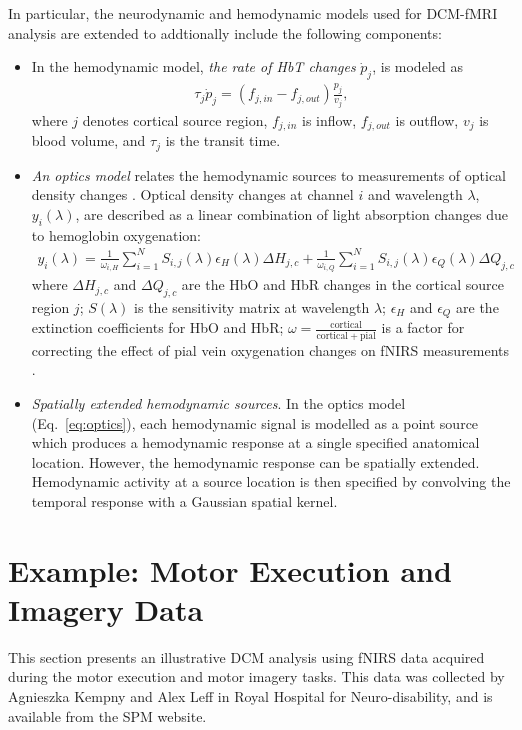 In particular, the neurodynamic and hemodynamic models used for DCM-fMRI analysis \citep{Friston2003a} are extended to addtionally include the following components:
\begin{itemize} 
\item In the hemodynamic model, \emph{the rate of HbT changes} $\dot{p}_j$, \citep{cui10} is modeled as
\begin{eqnarray} 
\tau_j \dot{p}_j  =  \left(f_{j,in} - f_{j,out}\right)\frac{p_j}{v_j},
\end{eqnarray}
where $j$ denotes cortical source region, $f_{j,in}$ is inflow, $f_{j,out}$ is outflow, $v_j$ is blood volume, and $\tau_j$ is the transit time. 

\item \emph{An optics model} relates the hemodynamic sources to measurements of optical density changes \citep{delpy1988estimation, arridge1999optical}. Optical density changes at channel $i$ and wavelength $\lambda$, $y_i(\lambda)$, are described as a linear combination of light absorption changes due to hemoglobin oxygenation: 
\begin{eqnarray}\label{eq:optics} 
y_i (\lambda) = \frac{1}{\omega_{i,H}} \sum_{i=1}^{N} S_{i,j}(\lambda)\epsilon_H(\lambda) \Delta H_{j,c} +  \frac{1}{\omega_{i,Q}} \sum_{i=1}^{N} S_{i,j}(\lambda)\epsilon_Q(\lambda) \Delta Q_{j,c}
\end{eqnarray} 
where $\Delta H_{j,c}$ and $\Delta Q_{j,c}$ are the HbO and HbR changes in the cortical source region $j$; $S(\lambda)$ is the sensitivity matrix at wavelength $\lambda$; $\epsilon_H$ and $\epsilon_Q$ are the extinction coefficients for HbO and HbR; $\omega = \frac{\mathrm{cortical}}{\mathrm{cortical} + \mathrm{pial}}$ is a factor for correcting the effect of pial vein oxygenation changes on fNIRS measurements  \citep{gagnon2012quantification}. 

\item \emph{Spatially extended hemodynamic sources}. In the optics model (Eq.~\ref{eq:optics}), each hemodynamic signal is modelled as a point source which produces a hemodynamic response at a single specified anatomical location. However, the hemodynamic response can be spatially extended. Hemodynamic activity at a source location is then specified by convolving the temporal response with a Gaussian spatial kernel.

\end{itemize} 

\newpage
\section{Example: Motor Execution and Imagery Data} 
This section presents an illustrative DCM analysis using fNIRS data acquired during the motor execution and motor imagery tasks. This data was collected by Agnieszka Kempny and Alex Leff in Royal Hospital for Neuro-disability, and is available from the SPM website. 

